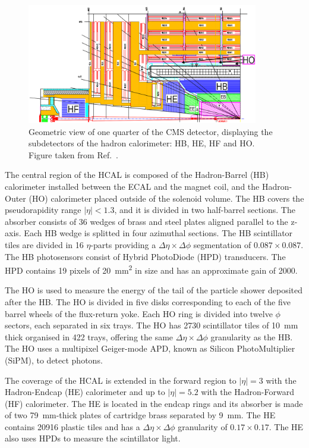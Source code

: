 \begin{figure}[!htbp]
 \centering
 \includegraphics[width=0.9\textwidth]{Figures/Experiment/CMS/HCAL.png}
 \caption{Geometric view of one quarter of the CMS detector, displaying the subdetectors of the hadron calorimeter: HB, HE, HF and HO. Figure taken from Ref.~\cite{CMSHCALUpgrade}.}
 \label{fig:CMS_HCAL}
\end{figure}

The central region of the HCAL is composed of the Hadron-Barrel (HB) calorimeter installed between the ECAL and the magnet coil, and the Hadron-Outer (HO) calorimeter placed outside of the solenoid volume. The HB covers the pseudorapidity range $|\eta| < 1.3$, and it is divided in two half-barrel sections. The absorber consists of 36 wedges of brass and steel plates aligned parallel to the z-axis. Each HB wedge is splitted in four azimuthal sections. The HB scintillator tiles are divided in 16 $\eta$-parts providing a $\Delta\eta{\times}\Delta\phi$ segmentation of $0.087{\times}0.087$. The HB photosensors consist of  Hybrid PhotoDiode (HPD) transducers. The HPD contains 19 pixels of \SI{20}{\mm\squared} in size and has an approximate gain of 2000.

The HO is used to measure the energy of the tail of the particle shower deposited after the HB. The HO is divided in five disks corresponding to each of the five barrel wheels of the flux-return yoke. Each HO ring is divided into twelve $\phi$ sectors, each separated in six trays. The HO has 2730 scintillator tiles of \SI{10}{\mm} thick organised in 422 trays, offering the same $\Delta\eta{\times}\Delta\phi$ granularity as the HB. The HO uses a multipixel Geiger-mode APD, known as Silicon PhotoMultiplier (SiPM), to detect photons.

The coverage of the HCAL is extended in the forward region to $|\eta| = 3$ with the Hadron-Endcap (HE) calorimeter and up to $|\eta| = 5.2$ with the Hadron-Forward (HF) calorimeter. The HE is located in the endcap rings and its absorber is made of two \SI{79}{\mm}-thick plates of cartridge brass separated by \SI{9}{\mm}. The HE contains 20916 plastic tiles and has a $\Delta\eta{\times}\Delta\phi$ granularity of  $0.17{\times}0.17$. The HE also uses HPDs to measure the scintillator light.

